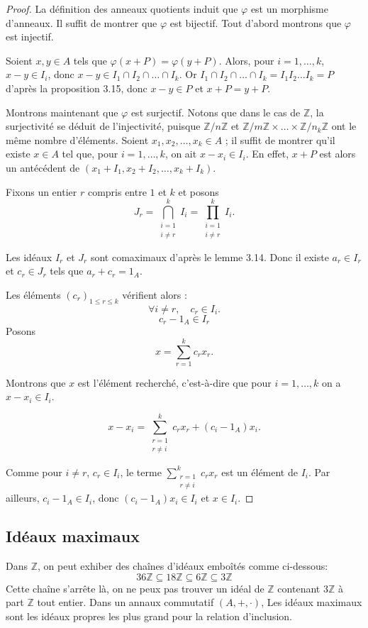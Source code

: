 \begin{proof}
    La définition des anneaux quotients induit que $\varphi$ est un morphisme d’anneaux. Il suffit de montrer que $\varphi$ est bijectif. Tout d’abord montrons que $\varphi$ est injectif.

Soient $x, y \in A$ tels que $\varphi(x + P) = \varphi(y + P)$. Alors, pour $i = 1, \dots, k$, $x - y \in I_i$, donc $x - y \in I_1 \cap I_2 \cap \dots \cap I_k$. Or $I_1 \cap I_2 \cap \dots \cap I_k = I_1 I_2 \dots I_k = P$ d’après la proposition 3.15, donc $x - y \in P$ et $x + P = y + P$.

Montrons maintenant que $\varphi$ est surjectif. Notons que dans le cas de $\mathbb{Z}$, la surjectivité se déduit de l’injectivité, puisque $\mathbb{Z}/n\mathbb{Z}$ et $\mathbb{Z}/m\mathbb{Z} \times \dots \times \mathbb{Z}/n_k\mathbb{Z}$ ont le même nombre d’éléments. Soient $x_1, x_2, \dots, x_k \in A$ ; il suffit de montrer qu’il existe $x \in A$ tel que, pour $i = 1, \dots, k$, on ait $x - x_i \in I_i$. En effet, $x + P$ est alors un antécédent de $(x_1 + I_1, x_2 + I_2, \dots, x_k + I_k)$.

Fixons un entier $r$ compris entre $1$ et $k$ et posons
\[
J_r = \bigcap_{\substack{i=1 \\ i \neq r}}^{k} I_i = \prod_{\substack{i=1 \\ i \neq r}}^{k} I_i.
\]

Les idéaux $I_r$ et $J_r$ sont comaximaux d’après le lemme 3.14. Donc il existe $a_r \in I_r$ et $c_r \in J_r$ tels que $a_r + c_r = 1_A$.

Les éléments $(c_r)_{1 \leq r \leq k}$ vérifient alors :
\[
\forall i \neq r, \quad c_r \in I_i.
\]
\[
c_r-1_A \in I_r
\]
Posons
\[
x = \sum_{r=1}^{k} c_r x_r.
\]

Montrons que $x$ est l’élément recherché, c’est-à-dire que pour $i = 1, \dots, k$ on a $x - x_i \in I_i$.

\[
x - x_i = \sum_{\substack{r=1 \\ r \neq i}}^{k} c_r x_r + (c_i - 1_A)x_i.
\]

Comme pour $i \neq r$, $c_r \in I_i$, le terme $\sum_{\substack{r=1 \\ r \neq i}}^{k} c_r x_r$ est un élément de $I_i$. Par ailleurs, $c_i - 1_A \in I_i$, donc $(c_i - 1_A)x_i \in I_i$ et $x \in I_i$. 

\end{proof}
\subsection{Idéaux maximaux}
Dans $\mathbb{Z}$, on peut exhiber des chaînes d'idéaux emboîtés comme ci-dessous:
\[
36\mathbb{Z}\subseteq18\mathbb{Z}\subseteq 6\mathbb{Z}\subseteq3\mathbb{Z}
\]
Cette chaîne s'arrête là, on ne peux pas trouver un idéal de $\mathbb{Z}$ contenant $3\mathbb{Z}$ à part $\mathbb{Z}$ tout entier. Dans un annaux commutatif $(A,+,\cdot)$, Les idéaux maximaux sont les idéaux propres les plus \og grand \fg pour la relation d'inclusion.

